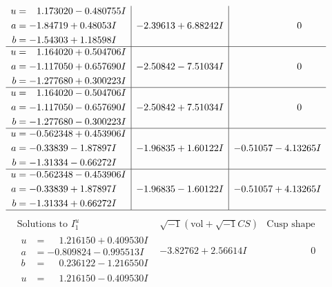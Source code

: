 \documentclass[1p]{elsarticle_modified}
\theoremstyle{definition}
\newcommand{\I}{\sqrt{-1}}
\begin{document}
$$\begin{array}{c|c|c}
\begin{aligned}
u &= \phantom{-}1.173020 - 0.480755 I \\
a &= -1.84719 + 0.48053 I \\
b &= -1.54303 + 1.18598 I\end{aligned}
 & -2.39613 + 6.88242 I & \phantom{-0.000000 } 0 \\ \hline\begin{aligned}
u &= \phantom{-}1.164020 + 0.504706 I \\
a &= -1.117050 + 0.657690 I \\
b &= -1.277680 + 0.300223 I\end{aligned}
 & -2.50842 - 7.51034 I & \phantom{-0.000000 } 0 \\ \hline\begin{aligned}
u &= \phantom{-}1.164020 - 0.504706 I \\
a &= -1.117050 - 0.657690 I \\
b &= -1.277680 - 0.300223 I\end{aligned}
 & -2.50842 + 7.51034 I & \phantom{-0.000000 } 0 \\ \hline\begin{aligned}
u &= -0.562348 + 0.453906 I \\
a &= -0.33839 - 1.87897 I \\
b &= -1.31334 - 0.66272 I\end{aligned}
 & -1.96835 + 1.60122 I & -0.51057 - 4.13265 I \\ \hline\begin{aligned}
u &= -0.562348 - 0.453906 I \\
a &= -0.33839 + 1.87897 I \\
b &= -1.31334 + 0.66272 I\end{aligned}
 & -1.96835 - 1.60122 I & -0.51057 + 4.13265 I\\
 \hline 
 \end{array}$$\newpage$$\begin{array}{c|c|c}  
\text{Solutions to }I^u_{1}& \I (\text{vol} + \sqrt{-1}CS) & \text{Cusp shape}\\
 \hline 
\begin{aligned}
u &= \phantom{-}1.216150 + 0.409530 I \\
a &= -0.809824 - 0.995513 I \\
b &= \phantom{-}0.236122 - 1.216550 I\end{aligned}
 & -3.82762 + 2.56614 I & \phantom{-0.000000 } 0 \\ \hline\begin{aligned}
u &= \phantom{-}1.216150 - 0.409530 I \\

\end{aligned}
\end{array}$$
\end{document}
